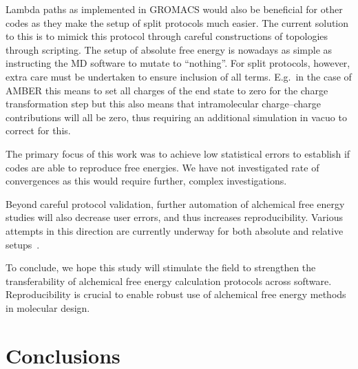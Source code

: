 \documentclass[journal=jctcce,manuscript=article]{achemso}
\begin{document}
Lambda paths as implemented in GROMACS would also be beneficial for other codes as they make the setup of split protocols much easier.  The current solution to 
this is to mimick this protocol through careful constructions of 
topologies through scripting.  The setup of absolute free energy is nowadays as 
simple as instructing the MD software to mutate to ``nothing''.  For split 
protocols, however, extra care must be undertaken to ensure inclusion of all 
terms.  E.g.\ in the case of AMBER this means to set all charges of the end 
state to zero for the charge transformation step but this also means that 
intramolecular charge--charge contributions will all be zero, thus requiring an
additional simulation in vacuo to correct for this.

The primary focus of this work was to achieve low statistical errors to 
establish if codes are able to reproduce free energies.  We have not 
investigated rate of convergences as this would require further, complex investigations.  

Beyond careful protocol validation,  further automation of alchemical free energy studies will also decrease user errors, and thus increases  reproducibility.  Various attempts in 
this direction are currently underway for both absolute and relative 
setups~\cite{christ_accuracy_2013, JCC:JCC23804, Liu2013, 
doi:10.1021/jp505332p, doi:10.1021/acs.jcim.6b00162, 
doi:10.1021/acs.jctc.6b00979,loeffler_fesetup:_2015}.

To conclude, we hope this study will stimulate the field to strengthen the transferability of alchemical free energy calculation protocols across software.  Reproducibility is crucial to enable robust use of alchemical free energy methods in molecular design. 


\section{Conclusions}
\label{sec:conclusions}
\end{document}
